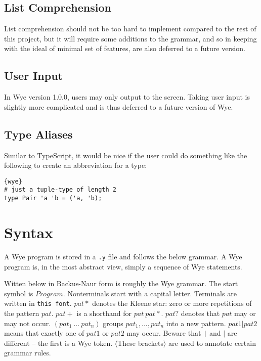\documentclass[a4paper, 12pt]{article}
\theoremstyle{myplain}
\theoremstyle{mydefinition}
\theoremstyle{myremark}
\numberwithin{equation} {section}
\numberwithin{figure}   {section}
\numberwithin{table}    {section}
\newcommand{\version}{1.0.0}
\begin{document}
\subsection{List Comprehension}
List comprehension should not be too hard to implement compared to the rest of this project, but it will require some additions to the grammar, and so in keeping with the ideal of minimal set of features, are also deferred to a future version.

\subsection{User Input}
In Wye version \version{}, users may only output to the screen. Taking user input is slightly more complicated and is thus deferred to a future version of Wye.

\subsection{Type Aliases}
Similar to TypeScript, it would be nice if the user could do something like the following to create an abbreviation for a type:
\begin{lstlisting}{wye}
# just a tuple-type of length 2
type Pair 'a 'b = ('a, 'b);
\end{lstlisting}

\section{Syntax}
A Wye program is stored in a \texttt{.y} file and follows the below grammar. A Wye program is, in the most abstract view, simply a sequence of Wye statements.

Witten below in Backus-Naur form is roughly the Wye grammar. The start symbol is $Program$. Nonterminals start with a capital letter. Terminals are written in \texttt{this font}. $pat*$ denotes the Kleene star: zero or more repetitions of the pattern $pat$. $pat+$ is a shorthand for $pat\: pat*$. $pat?$ denotes that $pat$ may or may not occur. $( pat_1\:...\: pat_n )$ groups $pat_1, ..., pat_n$ into a new pattern. $pat1 | pat2$ means that exactly one of $pat1$ or $pat2$ may occur. Beware that \texttt{|} and $|$ are different -- the first is a Wye token. $\langle$These brackets$\rangle$ are used to annotate certain grammar rules.
\end{document}
